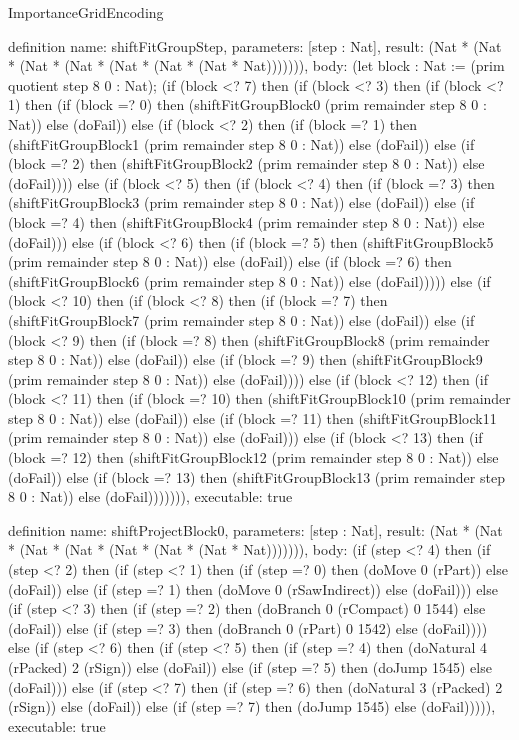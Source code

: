 \begin{lexlean}{ImportanceGridEncoding}
\begin{semanticmodule}
definition{
  name: shiftFitGroupStep,
  parameters: [step : Nat],
  result: (Nat * (Nat * (Nat * (Nat * (Nat * (Nat * (Nat * Nat))))))),
  body: (let block : Nat := (prim quotient step 8 0 : Nat); (if (block <? 7) then
      (if (block <? 3) then
      (if (block <? 1) then
      (if (block =? 0) then (shiftFitGroupBlock0 (prim remainder step 8 0 : Nat)) else (doFail)) else
      (if (block <? 2) then
      (if (block =? 1) then (shiftFitGroupBlock1 (prim remainder step 8 0 : Nat)) else (doFail)) else
      (if (block =? 2) then (shiftFitGroupBlock2 (prim remainder step 8 0 : Nat)) else (doFail)))) else
      (if (block <? 5) then
      (if (block <? 4) then
      (if (block =? 3) then (shiftFitGroupBlock3 (prim remainder step 8 0 : Nat)) else (doFail)) else
      (if (block =? 4) then (shiftFitGroupBlock4 (prim remainder step 8 0 : Nat)) else (doFail))) else
      (if (block <? 6) then
      (if (block =? 5) then (shiftFitGroupBlock5 (prim remainder step 8 0 : Nat)) else (doFail)) else
      (if (block =? 6) then (shiftFitGroupBlock6 (prim remainder step 8 0 : Nat)) else (doFail))))) else
      (if (block <? 10) then
      (if (block <? 8) then
      (if (block =? 7) then (shiftFitGroupBlock7 (prim remainder step 8 0 : Nat)) else (doFail)) else
      (if (block <? 9) then
      (if (block =? 8) then (shiftFitGroupBlock8 (prim remainder step 8 0 : Nat)) else (doFail)) else
      (if (block =? 9) then (shiftFitGroupBlock9 (prim remainder step 8 0 : Nat)) else (doFail)))) else
      (if (block <? 12) then
      (if (block <? 11) then
      (if (block =? 10) then (shiftFitGroupBlock10 (prim remainder step 8 0 : Nat)) else (doFail)) else
      (if (block =? 11) then (shiftFitGroupBlock11 (prim remainder step 8 0 : Nat)) else (doFail))) else
      (if (block <? 13) then
      (if (block =? 12) then (shiftFitGroupBlock12 (prim remainder step 8 0 : Nat)) else (doFail)) else
      (if (block =? 13) then (shiftFitGroupBlock13 (prim remainder step 8 0 : Nat)) else (doFail))))))),
  executable: true
}

definition{
  name: shiftProjectBlock0,
  parameters: [step : Nat],
  result: (Nat * (Nat * (Nat * (Nat * (Nat * (Nat * (Nat * Nat))))))),
  body: (if (step <? 4) then
      (if (step <? 2) then
      (if (step <? 1) then
      (if (step =? 0) then (doMove 0 (rPart)) else (doFail)) else
      (if (step =? 1) then (doMove 0 (rSawIndirect)) else (doFail))) else
      (if (step <? 3) then
      (if (step =? 2) then (doBranch 0 (rCompact) 0 1544) else (doFail)) else
      (if (step =? 3) then (doBranch 0 (rPart) 0 1542) else (doFail)))) else
      (if (step <? 6) then
      (if (step <? 5) then
      (if (step =? 4) then (doNatural 4 (rPacked) 2 (rSign)) else (doFail)) else
      (if (step =? 5) then (doJump 1545) else (doFail))) else
      (if (step <? 7) then
      (if (step =? 6) then (doNatural 3 (rPacked) 2 (rSign)) else (doFail)) else
      (if (step =? 7) then (doJump 1545) else (doFail))))),
  executable: true
}


\end{semanticmodule}
\end{lexlean}
